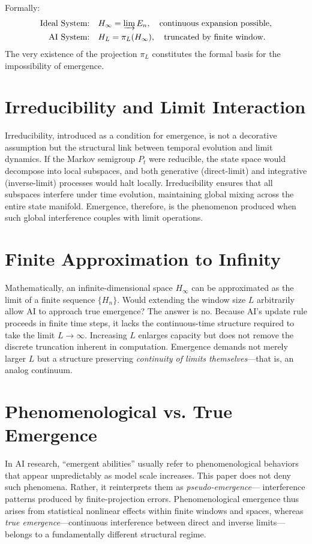 \documentclass[12pt]{article}
\begin{document}
Formally:
\begin{align*}
\text{Ideal System:} & \quad H_\infty = \varinjlim E_n, \quad \text{continuous expansion possible}, \\
\text{AI System:} & \quad H_L = \pi_L(H_\infty), \quad \text{truncated by finite window.}
\end{align*}
The very existence of the projection $\pi_L$ constitutes
the formal basis for the impossibility of emergence.

\section{Irreducibility and Limit Interaction}
Irreducibility, introduced as a condition for emergence,
is not a decorative assumption but the structural link between temporal evolution and limit dynamics.
If the Markov semigroup $P_t$ were reducible, the state space would decompose into local subspaces,
and both generative (direct-limit) and integrative (inverse-limit) processes would halt locally.
Irreducibility ensures that all subspaces interfere under time evolution,
maintaining global mixing across the entire state manifold.
Emergence, therefore, is the phenomenon produced when such global interference couples with limit operations.

\section{Finite Approximation to Infinity}
Mathematically, an infinite-dimensional space $H_\infty$ can be approximated
as the limit of a finite sequence $\{H_n\}$.
Would extending the window size $L$ arbitrarily allow AI to approach true emergence?
The answer is no.
Because AI’s update rule proceeds in finite time steps,
it lacks the continuous-time structure required to take the limit $L \to \infty$.
Increasing $L$ enlarges capacity but does not remove the discrete truncation inherent in computation.
Emergence demands not merely larger $L$ but
a structure preserving \textit{continuity of limits themselves}—that is, an analog continuum.

\section{Phenomenological vs. True Emergence}
In AI research, ``emergent abilities'' usually refer to
phenomenological behaviors that appear unpredictably as model scale increases.
This paper does not deny such phenomena.
Rather, it reinterprets them as \textit{pseudo-emergence}—
interference patterns produced by finite-projection errors.
Phenomenological emergence thus arises from statistical nonlinear effects
within finite windows and spaces,
whereas \textit{true emergence}—continuous interference between direct and inverse limits—
belongs to a fundamentally different structural regime.
\end{document}
